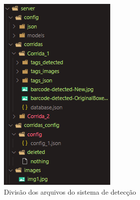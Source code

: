 \begin{figure}[H]
	\centering
	\includegraphics[width=0.4\linewidth]{figuras/MachineLearning/folderSystem.png}
	\caption{Divisão dos arquivos do sistema de detecção}
	\label{fig:folderSystem}
\end{figure}

